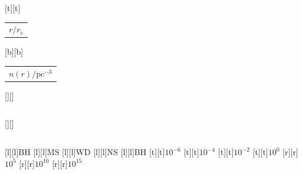 %    
%
%
\begin{psfrags}%
\psfragscanon%
%
[t][t]{\color[rgb]{0,0,0}\setlength{\tabcolsep}{0pt}\begin{tabular}{c}{\Large$r/r_\text{c}$}\end{tabular}}%
[b][b]{\color[rgb]{0,0,0}\setlength{\tabcolsep}{0pt}\begin{tabular}{c}{\Large$n(r)/\text{pc}^{-3}$}\end{tabular}}%
[][]{\color[rgb]{0,0,0}\setlength{\tabcolsep}{0pt}\begin{tabular}{c} \end{tabular}}%
[][]{\color[rgb]{0,0,0}\setlength{\tabcolsep}{0pt}\begin{tabular}{c} \end{tabular}}%
[l][l]{\color[rgb]{0,0,0}BH}%
[l][l]{\color[rgb]{0,0,0}MS}%
[l][l]{\color[rgb]{0,0,0}WD}%
[l][l]{\color[rgb]{0,0,0}NS}%
[l][l]{\color[rgb]{0,0,0}BH}%
%
[t][t]{$10^{-6}$}%
[t][t]{$10^{-4}$}%
[t][t]{$10^{-2}$}%
[t][t]{$10^{0}$}%
%
[r][r]{$10^{5}$}%
[r][r]{$10^{10}$}%
[r][r]{$10^{15}$}%
%
%
\end{psfrags}%
%
